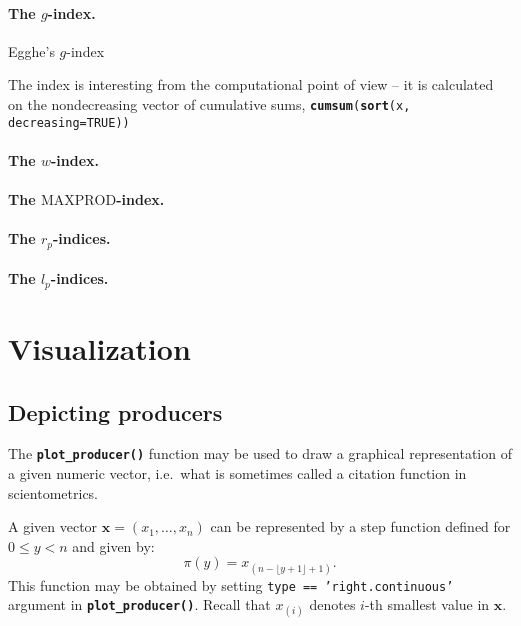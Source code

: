 \documentclass[11pt]{article}\usepackage{graphicx, color}
\newcommand{\hlfunctioncall}[1]{\textcolor[rgb]{0.501960784313725,0,0.329411764705882}{\textbf{#1}}}%
\newcommand{\Rfunc}[1]{\texttt{\hlfunctioncall{#1}}}
\newcommand{\vect}[1]{{\mathbf{#1}}}
\theoremstyle{remark}
\theoremstyle{definition}
\begin{document}
\paragraph{The $g$-index.}
Egghe's $g$-index \cite{Egghe2006:g}

The index is interesting from the computational point of view --
it is calculated on the nondecreasing vector of cumulative sums,
\texttt{\Rfunc{cumsum}(\Rfunc{sort}(x, decreasing=TRUE))}


\paragraph{The $w$-index.}



\paragraph{The $\mathrm{MAXPROD}$-index.}




\paragraph{The $r_p$-indices.}



\paragraph{The $l_p$-indices.}





\section{Visualization}


\subsection{Depicting producers}

The \Rfunc{plot\_producer()} function may be used to draw
a graphical representation of a given numeric vector,
i.e.~what is sometimes called a citation function in scientometrics.

A given vector $\mathbf{x}=(x_1,\dots,x_n)$ can be represented by a
step function defined for $0\le y<n$ and given by:
\[
   \pi(y)=x_{(n-\lfloor y+1\rfloor+1)}.
\]
This function may be obtained by setting \texttt{type == 'right.continuous'}
argument in \Rfunc{plot\_pro\-du\-cer()}.
Recall that $x_{(i)}$ denotes $i$-th smallest value in $\vect{x}$.
\end{document}
